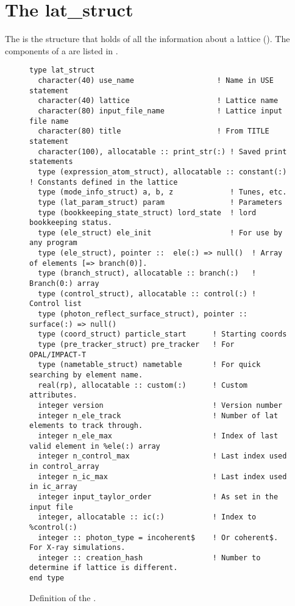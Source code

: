 \chapter{The lat_struct}
\label{c:lat.struct}

The  is the structure that holds of all the information
about a lattice (). The components of a
 are listed in .
\begin{figure}[htb]
\centering
\begin{verbatim}
type lat_struct
  character(40) use_name                   ! Name in USE statement
  character(40) lattice                    ! Lattice name
  character(80) input_file_name            ! Lattice input file name
  character(80) title                      ! From TITLE statement
  character(100), allocatable :: print_str(:) ! Saved print statements
  type (expression_atom_struct), allocatable :: constant(:)  ! Constants defined in the lattice
  type (mode_info_struct) a, b, z             ! Tunes, etc.                       
  type (lat_param_struct) param               ! Parameters                        
  type (bookkeeping_state_struct) lord_state  ! lord bookkeeping status.          
  type (ele_struct) ele_init                  ! For use by any program            
  type (ele_struct), pointer ::  ele(:) => null()  ! Array of elements [=> branch(0)].
  type (branch_struct), allocatable :: branch(:)   ! Branch(0:) array
  type (control_struct), allocatable :: control(:) ! Control list
  type (photon_reflect_surface_struct), pointer :: surface(:) => null()
  type (coord_struct) particle_start      ! Starting coords
  type (pre_tracker_struct) pre_tracker   ! For OPAL/IMPACT-T
  type (nametable_struct) nametable       ! For quick searching by element name.
  real(rp), allocatable :: custom(:)      ! Custom attributes.
  integer version                         ! Version number
  integer n_ele_track                     ! Number of lat elements to track through.
  integer n_ele_max                       ! Index of last valid element in %ele(:) array
  integer n_control_max                   ! Last index used in control_array
  integer n_ic_max                        ! Last index used in ic_array
  integer input_taylor_order              ! As set in the input file
  integer, allocatable :: ic(:)           ! Index to %control(:)
  integer :: photon_type = incoherent$    ! Or coherent$. For X-ray simulations.
  integer :: creation_hash                ! Number to determine if lattice is different.
end type
\end{verbatim}
\caption{Definition of the .}
\label{f:lat.struct}
\end{figure}

